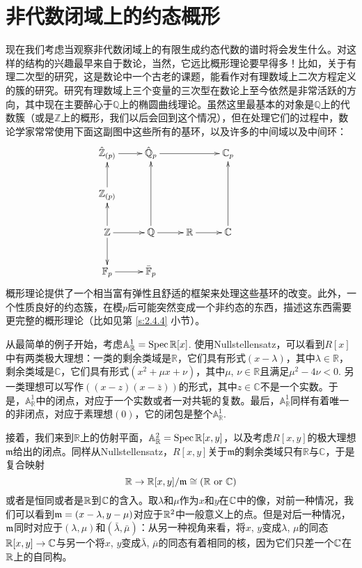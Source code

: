 \section{非代数闭域上的约态概形}

现在我们考虑当观察非代数闭域上的有限生成约态代数的谱时将会发生什么。对这样的结构的兴趣最早来自于数论，当然，它远比概形理论要早得多！比如，关于有理二次型的研究，这是数论中一个古老的课题，能看作对有理数域上二次方程定义的簇的研究。研究有理数域上三个变量的三次型在数论上至今依然是非常活跃的方向，其中现在主要醉心于$\mathbb{Q}$上的椭圆曲线理论。虽然这里最基本的对象是$\mathbb{Q}$上的代数簇（或是$\mathbb{Z}$上的概形，我们以后会回到这个情况），但在处理它们的过程中，数论学家常常使用下面这副图中这些所有的基环，以及许多的中间域以及中间环：
\[
\begin{xy}
	\xymatrix{
		\hat{\mathbb{Z}}_{(p)}\ar[r]&\hat{\mathbb{Q}}_{p}\ar[rr]&&\mathbb{C}_p\\
		\mathbb{Z}_{(p)}\ar[u]&&&\\
		\mathbb{Z}\ar[u]\ar[r]\ar[d]&\mathbb{Q}\ar[r]\ar[uu]&\mathbb{R}\ar[r]&\mathbb{C}\ar[uu]\\
		\mathbb{F}_p\ar[r]&\bar{\mathbb{F}}_p&&&
	}
\end{xy}
\]
概形理论提供了一个相当富有弹性且舒适的框架来处理这些基环的改变。此外，一个性质良好的约态簇，在模$p$后可能突然变成一个非约态的东西，描述这东西需要更完整的概形理论（比如见第 \ref{s:2.4.4} 小节）。

从最简单的例子开始，考虑$\mathbb{A}_{\mathbb{R}}^1=\operatorname{Spec} \mathbb{R}[x]$. 使用Nullstellensatz，可以看到$R[x]$中有两类极大理想：一类的剩余类域是$\mathbb{R}$，它们具有形式$(x-\lambda)$，其中$\lambda\in\mathbb{R}$，剩余类域是$\mathbb{C}$，它们具有形式$(x^2+\mu x+\nu)$，其中$\mu$, $\nu\in\mathbb{R}$且满足$\mu^2-4\nu<0$. 另一类理想可以写作$((x-z)(x-\bar{z}))$的形式，其中$z\in \mathbb{C}$不是一个实数。于是，$\mathbb{A}_{\mathbb{R}}^1$中的闭点，对应于一个实数或者一对共轭的复数。最后，$\mathbb{A}_{\mathbb{R}}^1$同样有着唯一的非闭点，对应于素理想$(0)$，它的闭包是整个$\mathbb{A}_{\mathbb{R}}^1$.

接着，我们来到$\mathbb{R}$上的仿射平面，$\mathbb{A}_{\mathbb{R}}^2=\operatorname{Spec} \mathbb{R}[x,y]$，以及考虑$R[x,y]$的极大理想$\mathfrak{m}$给出的闭点。同样从Nullstellensatz，$R[x,y]$关于$\mathfrak{m}$的剩余类域只有$\mathbb{R}$与$\mathbb{C}$，于是复合映射
\[
	\mathbb{R}\to \mathbb{R}[x,y]/\mathfrak{m}\cong (\mathbb{R} \text{ or } \mathbb{C})
\]
或者是恒同或者是$\mathbb{R}$到$\mathbb{C}$的含入。取$\lambda$和$\mu$作为$x$和$y$在$\mathbb{C}$中的像，对前一种情况，我们可以看到$\mathfrak{m}=(x-\lambda,y-\mu)$对应于$\mathbb{R}^2$中一般意义上的点。但是对后一种情况，$\mathfrak{m}$同时对应于$(\lambda,\mu)$和$(\bar\lambda,\bar\mu)$：从另一种视角来看，将$x$, $y$变成$\lambda$, $\mu$的同态$\mathbb{R}[x,y]\to \mathbb{C}$与另一个将$x$, $y$变成$\bar\lambda$, $\bar\mu$的同态有着相同的核，因为它们只差一个$\mathbb{C}$在$\mathbb{R}$上的自同构。

